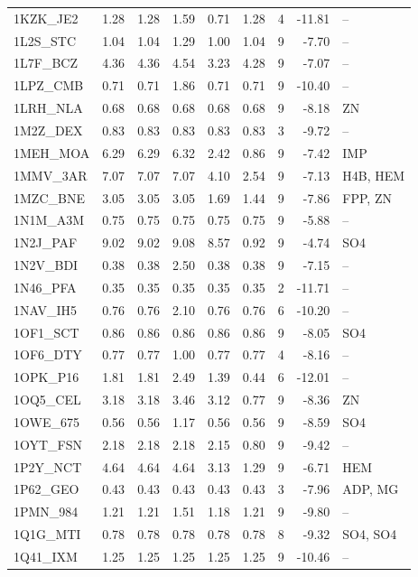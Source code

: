 \begin{longtable}{lrrrrrrrp{2.6cm}}
1KZK\_JE2 & 1.28 & 1.28 & 1.59 & 0.71 & 1.28 & 4 & -11.81 & -- \\
1L2S\_STC & 1.04 & 1.04 & 1.29 & 1.00 & 1.04 & 9 & -7.70 & -- \\
1L7F\_BCZ & 4.36 & 4.36 & 4.54 & 3.23 & 4.28 & 9 & -7.07 & -- \\
1LPZ\_CMB & 0.71 & 0.71 & 1.86 & 0.71 & 0.71 & 9 & -10.40 & -- \\
1LRH\_NLA & 0.68 & 0.68 & 0.68 & 0.68 & 0.68 & 9 & -8.18 & ZN \\
1M2Z\_DEX & 0.83 & 0.83 & 0.83 & 0.83 & 0.83 & 3 & -9.72 & -- \\
1MEH\_MOA & 6.29 & 6.29 & 6.32 & 2.42 & 0.86 & 9 & -7.42 & IMP \\
1MMV\_3AR & 7.07 & 7.07 & 7.07 & 4.10 & 2.54 & 9 & -7.13 & H4B, HEM \\
1MZC\_BNE & 3.05 & 3.05 & 3.05 & 1.69 & 1.44 & 9 & -7.86 & FPP, ZN \\
1N1M\_A3M & 0.75 & 0.75 & 0.75 & 0.75 & 0.75 & 9 & -5.88 & -- \\
1N2J\_PAF & 9.02 & 9.02 & 9.08 & 8.57 & 0.92 & 9 & -4.74 & SO4 \\
1N2V\_BDI & 0.38 & 0.38 & 2.50 & 0.38 & 0.38 & 9 & -7.15 & -- \\
1N46\_PFA & 0.35 & 0.35 & 0.35 & 0.35 & 0.35 & 2 & -11.71 & -- \\
1NAV\_IH5 & 0.76 & 0.76 & 2.10 & 0.76 & 0.76 & 6 & -10.20 & -- \\
1OF1\_SCT & 0.86 & 0.86 & 0.86 & 0.86 & 0.86 & 9 & -8.05 & SO4 \\
1OF6\_DTY & 0.77 & 0.77 & 1.00 & 0.77 & 0.77 & 4 & -8.16 & -- \\
1OPK\_P16 & 1.81 & 1.81 & 2.49 & 1.39 & 0.44 & 6 & -12.01 & -- \\
1OQ5\_CEL & 3.18 & 3.18 & 3.46 & 3.12 & 0.77 & 9 & -8.36 & ZN \\
1OWE\_675 & 0.56 & 0.56 & 1.17 & 0.56 & 0.56 & 9 & -8.59 & SO4 \\
1OYT\_FSN & 2.18 & 2.18 & 2.18 & 2.15 & 0.80 & 9 & -9.42 & -- \\
1P2Y\_NCT & 4.64 & 4.64 & 4.64 & 3.13 & 1.29 & 9 & -6.71 & HEM \\
1P62\_GEO & 0.43 & 0.43 & 0.43 & 0.43 & 0.43 & 3 & -7.96 & ADP, MG \\
1PMN\_984 & 1.21 & 1.21 & 1.51 & 1.18 & 1.21 & 9 & -9.80 & -- \\
1Q1G\_MTI & 0.78 & 0.78 & 0.78 & 0.78 & 0.78 & 8 & -9.32 & SO4, SO4 \\
1Q41\_IXM & 1.25 & 1.25 & 1.25 & 1.25 & 1.25 & 9 & -10.46 & -- \\

\end{longtable}
